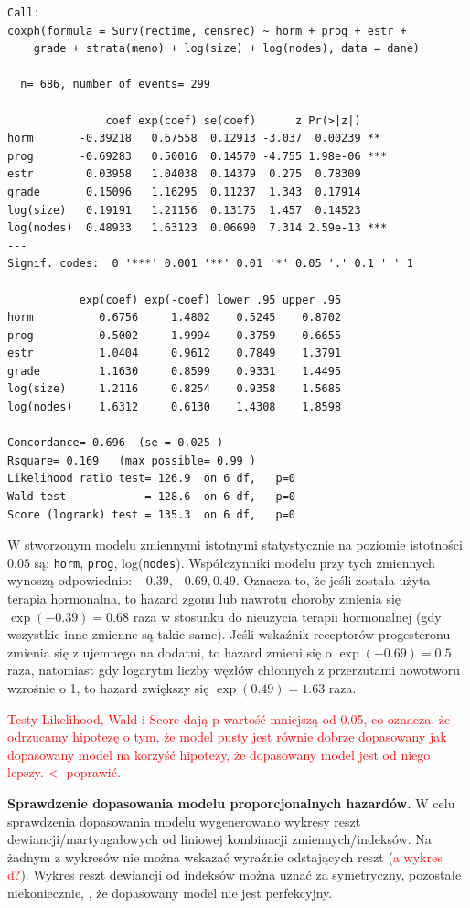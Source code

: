 \documentclass[]{article}
\begin{document}
\begin{verbatim}
Call:
coxph(formula = Surv(rectime, censrec) ~ horm + prog + estr + 
    grade + strata(meno) + log(size) + log(nodes), data = dane)

  n= 686, number of events= 299 

               coef exp(coef) se(coef)      z Pr(>|z|)    
horm       -0.39218   0.67558  0.12913 -3.037  0.00239 ** 
prog       -0.69283   0.50016  0.14570 -4.755 1.98e-06 ***
estr        0.03958   1.04038  0.14379  0.275  0.78309    
grade       0.15096   1.16295  0.11237  1.343  0.17914    
log(size)   0.19191   1.21156  0.13175  1.457  0.14523    
log(nodes)  0.48933   1.63123  0.06690  7.314 2.59e-13 ***
---
Signif. codes:  0 '***' 0.001 '**' 0.01 '*' 0.05 '.' 0.1 ' ' 1

           exp(coef) exp(-coef) lower .95 upper .95
horm          0.6756     1.4802    0.5245    0.8702
prog          0.5002     1.9994    0.3759    0.6655
estr          1.0404     0.9612    0.7849    1.3791
grade         1.1630     0.8599    0.9331    1.4495
log(size)     1.2116     0.8254    0.9358    1.5685
log(nodes)    1.6312     0.6130    1.4308    1.8598

Concordance= 0.696  (se = 0.025 )
Rsquare= 0.169   (max possible= 0.99 )
Likelihood ratio test= 126.9  on 6 df,   p=0
Wald test            = 128.6  on 6 df,   p=0
Score (logrank) test = 135.3  on 6 df,   p=0
\end{verbatim}

W stworzonym modelu zmiennymi istotnymi statystycznie na poziomie
istotności $0.05$ są: \texttt{horm}, \texttt{prog}, log(\texttt{nodes}).
Współczynniki modelu przy tych zmiennych wynoszą odpowiednio:
$-0.39, -0.69, 0.49$. Oznacza to, że jeśli została użyta terapia
hormonalna, to hazard zgonu lub nawrotu choroby zmienia się
$\exp(-0.39)=0.68$ raza w stosunku do nieużycia terapii hormonalnej (gdy
wszystkie inne zmienne są takie same). Jeśli wskaźnik receptorów
progesteronu zmienia się z ujemnego na dodatni, to hazard zmieni się o
$\exp(-0.69)=0.5$ raza, natomiast gdy logarytm liczby węzłów chłonnych z
przerzutami nowotworu wzrośnie o 1, to hazard zwiększy się
$\exp(0.49)=1.63$ raza.

\textcolor{red}{Testy Likelihood, Wald i Score dają p-wartość mniejszą od 0.05, co oznacza, że odrzucamy hipotezę o tym, że model pusty jest równie dobrze dopasowany jak dopasowany model na korzyść hipotezy, że dopasowany model jest od niego lepszy. <- poprawić.}

\newpage
\textbf{Sprawdzenie dopasowania modelu proporcjonalnych hazardów.}
\newline
W celu sprawdzenia dopasowania modelu wygenerowano wykresy reszt
dewiancji/martyngałowych od liniowej kombinacji zmiennych/indeksów. Na
żadnym z wykresów nie można wskazać wyraźnie odstających reszt
(\textcolor{red}{a wykres d?}). Wykres reszt dewiancji od indeksów można
uznać za symetryczny, pozostałe niekoniecznie, , że
dopasowany model nie jest perfekcyjny.
\end{document}
